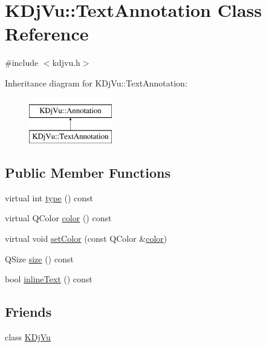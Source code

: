 \hypertarget{classKDjVu_1_1TextAnnotation}{\section{K\+Dj\+Vu\+:\+:Text\+Annotation Class Reference}
\label{classKDjVu_1_1TextAnnotation}
}


{\ttfamily \#include $<$kdjvu.\+h$>$}

Inheritance diagram for K\+Dj\+Vu\+:\+:Text\+Annotation\+:\begin{figure}[H]
\begin{center}
\leavevmode
\includegraphics[height=2.000000cm]{classKDjVu_1_1TextAnnotation}
\end{center}
\end{figure}
\subsection*{Public Member Functions}
\begin{DoxyCompactItemize}
\item 
virtual int \hyperlink{classKDjVu_1_1TextAnnotation_a992ee92b526e912ee1dd6338c54eb350}{type} () const 
\item 
virtual Q\+Color \hyperlink{classKDjVu_1_1TextAnnotation_aff59cc205ed543d4ec440d318025468e}{color} () const 
\item 
virtual void \hyperlink{classKDjVu_1_1TextAnnotation_afc4989881d5b7d3b399a3622712edfb9}{set\+Color} (const Q\+Color \&\hyperlink{classKDjVu_1_1TextAnnotation_aff59cc205ed543d4ec440d318025468e}{color})
\item 
Q\+Size \hyperlink{classKDjVu_1_1TextAnnotation_a01b6e794358e49a7aa686315c35793a6}{size} () const 
\item 
bool \hyperlink{classKDjVu_1_1TextAnnotation_adcaceabd4f08391e169c32b215a00b74}{inline\+Text} () const 
\end{DoxyCompactItemize}
\subsection*{Friends}
\begin{DoxyCompactItemize}
\item 
class \hyperlink{classKDjVu_1_1TextAnnotation_a4241ce0336d22245ffdb13dd5cb6edcc}{K\+Dj\+Vu}
\end{DoxyCompactItemize}
